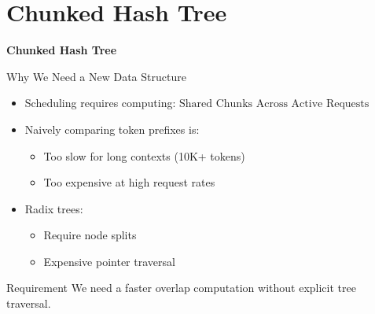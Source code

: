 \documentclass[Serif, 10pt, brown]{beamer}
\theoremstyle{example}
\theoremstyle{plain}
\begin{document}
\section{Chunked Hash Tree}

\begin{frame}
    \Huge{\centerline{\bf Chunked Hash Tree}}
\end{frame}

\begin{frame}{Why We Need a New Data Structure}
\begin{itemize}
    \item Scheduling requires computing: $\text{Shared Chunks Across Active Requests}$
    \item Naively comparing token prefixes is:
    \begin{itemize}
        \item Too slow for long contexts (10K+ tokens)
        \item Too expensive at high request rates
    \end{itemize}
    \item Radix trees:
    \begin{itemize}
        \item Require node splits
        \item Expensive pointer traversal
    \end{itemize}
\end{itemize}

\begin{block}{Requirement}
We need a faster overlap computation  without explicit tree traversal.
\end{block}

\end{frame}
\end{document}
